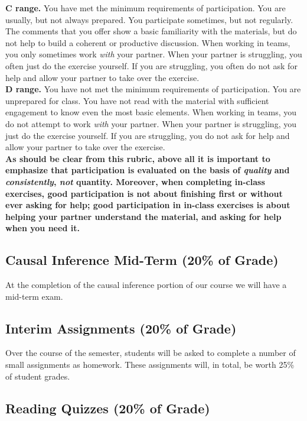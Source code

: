 \documentclass[12pt]{article}
\begin{document}
\textbf{C range.}  You have met the minimum requirements of participation.  You are usually, but not always prepared.  You participate sometimes, but not regularly.  The comments that you offer show a basic familiarity with the materials, but do not help to build a coherent or productive discussion.  When working in teams, you only sometimes work \emph{with} your partner. When your partner is struggling, you often just do the exercise yourself. If you are struggling, you often do not ask for help and allow your partner to take over the exercise. \\

\textbf{D range.}  You have not met the minimum requirements of participation.  You are unprepared for class.  You have not read with the material with sufficient engagement to know even the most basic elements.  When working in teams, you do not attempt to work \emph{with} your partner. When your partner is struggling, you just do the exercise yourself. If you are struggling, you do not ask for help and allow your partner to take over the exercise.\\

\textbf{As should be clear from this rubric, above all it is important to emphasize that participation is evaluated on the basis of \emph{quality} and \emph{consistently}, \emph{not} quantity. Moreover, when completing in-class exercises, good participation is not about finishing first or without ever asking for help; good participation in in-class exercises is about helping your partner understand the material, and asking for help when you need it.}

\subsection{Causal Inference Mid-Term (20\% of Grade)}

At the completion of the causal inference portion of our course we will have a mid-term exam. 

\subsection{Interim Assignments (20\% of Grade)}

Over the course of the semester, students will be asked to complete a number of small assignments as homework. These assignments will, in total, be worth 25\% of student grades.

\subsection{Reading Quizzes (20\% of Grade)}
\end{document}
